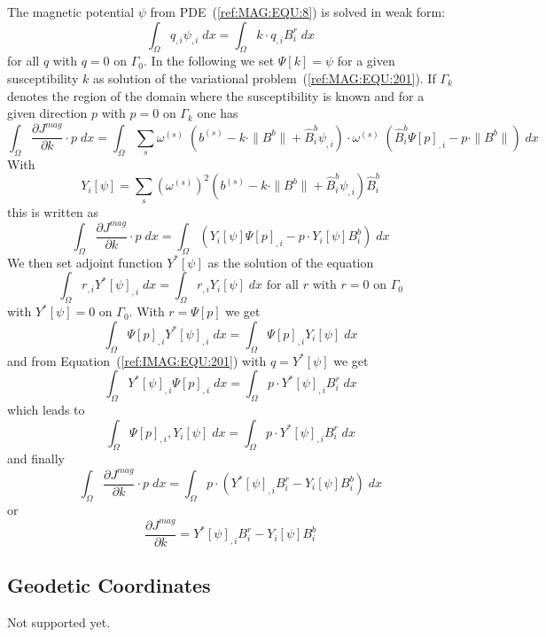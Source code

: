 The magnetic potential $\psi$ from PDE~(\ref{ref:MAG:EQU:8}) is solved in weak form:
\begin{equation}\label{ref:IMAG:EQU:201}
\int_{\Omega} q_{,i} \psi_{,i} \; dx  = \int_{\Omega}  k \cdot q_{,i}  B^r_i \; dx 
\end{equation} 
for all $q$ with $q=0$ on $\Gamma_{0}$.
In the following we set $\Psi[k]=\psi$ for a given susceptibility $k$ as
solution of the variational problem~(\ref{ref:MAG:EQU:201}).
If $\Gamma_{k}$ denotes the region of the domain where the susceptibility is
known and for a given direction $p$ with $p=0$ on $\Gamma_{k}$ one has
\begin{equation}\label{ref:IMAG:EQU:201aa}
\int_{\Omega}   \frac{\partial J^{mag}}{\partial k} \cdot p \; dx  = \int_{\Omega}  
\sum_{s} 
\omega^{(s)} \; \left(b^{(s)} - k \cdot  \|B^{b}\|  +  \hat{B}^{b}_i \psi_{,i}  \right)
\cdot \omega^{(s)} \; \left(\hat{B}^{b}_i \Psi[p]_{,i} - p \cdot  \|B^{b}\| \right) \; dx  
\end{equation}
With
\begin{equation}\label{ref:IMAG:EQU:202c}
Y_i[\psi]=   \sum_{s} 
(\omega^{(s)})^2 
\left(b^{(s)} - k \cdot  \|B^{b}\|  +  \hat{B}^{b}_i \psi_{,i} \right) \hat{B}^{b}_i
\end{equation} 
this is written as 
\begin{equation}\label{ref:IMAG:EQU:202cc}
\int_{\Omega}   \frac{\partial J^{mag}}{\partial k} \cdot p \;  dx  = \int_{\Omega}  
(Y_i[\psi] \Psi[p]_{,i} -p \cdot Y_i[\psi]B^b_i)   \; dx  
\end{equation} 
We then set adjoint function $Y^*[\psi]$ as the solution of the equation 
\begin{equation}\label{ref:IMAG:EQU:202d}
\int_{\Omega} r_{,i} Y^*[\psi]_{,i} \; dx  =  \int_{\Omega} r_{,i} Y_i[\psi]  \; dx  \mbox{ for all } r \mbox{ with } r=0 \mbox{ on } \Gamma_{0}
\end{equation} 
with $Y^*[\psi]=0$ on $\Gamma_{0}$. With $r=\Psi[p]$ we get
\begin{equation}\label{ref:IMAG:EQU:202dd}
\int_{\Omega} \Psi[p]_{,i} Y^*[\psi]_{,i} \; dx  =  \int_{\Omega} \Psi[p]_{,i} Y_i[\psi]  \; dx
\end{equation} 
and from Equation~(\ref{ref:IMAG:EQU:201}) with $q=Y^*[\psi]$ we get
\begin{equation}\label{ref:IMAG:EQU:20e}
\int_{\Omega} Y^*[\psi]_{,i}  \Psi[p]_{,i} \; dx  = \int_{\Omega}  p \cdot Y^*[\psi]_{,i}  B^r_i \; dx  
\end{equation}
which leads to 
\begin{equation}\label{ref:IMAG:EQU:20ee}
\int_{\Omega} \Psi[p]_{,i} ,Y_i[\psi]  \; dx  = \int_{\Omega}  p \cdot Y^*[\psi]_{,i}  B^r_i \; dx  
\end{equation}
and finally
\begin{equation}\label{ref:IMAG:EQU:201a}
\int_{\Omega}   \frac{\partial J^{mag}}{\partial k} \cdot p \;  dx  = \int_{\Omega}  
p \cdot (Y^*[\psi]_{,i}  B^r_i - Y_i[\psi] B^b_i) \; dx  
\end{equation} 
or 
\begin{equation}\label{ref:IMAG:EQU:201b}
\frac{\partial J^{mag}}{\partial k} = Y^*[\psi]_{,i}  B^r_i - Y_i[\psi] B^b_i
\end{equation}

\subsection{Geodetic Coordinates}
Not supported yet.
